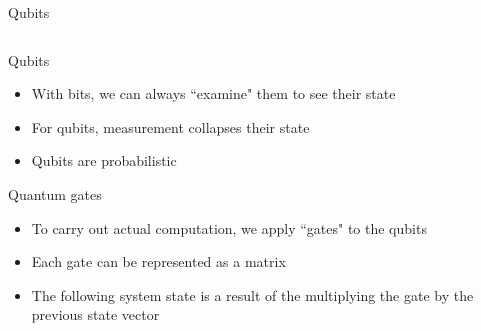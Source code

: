 \documentclass[14pt]{beamer}
\newcommand{\braket}[1]{\ensuremath{\left | #1 \right \rangle}}
\begin{document}
\begin{frame}{Qubits}
\begin{columns}[T]
\begin{column}{.4\textwidth}
\begin{block}{}
		\end{block}
	\end{column}
\end{columns}
\end{frame}

\begin{frame}{Qubits}
\begin{itemize}
	\item With bits, we can always ``examine" them to see their state
	\item For qubits, measurement collapses their state
	\item Qubits are probabilistic 
\end{itemize}
\end{frame}

\begin{frame}{Quantum gates}
\begin{itemize}
	\item To carry out actual computation, we apply ``gates" to the qubits
	\item Each gate can be represented as a matrix
	\item The following system state is a result of the multiplying the gate by the previous state vector
\end{itemize}
\end{frame}
\end{document}

